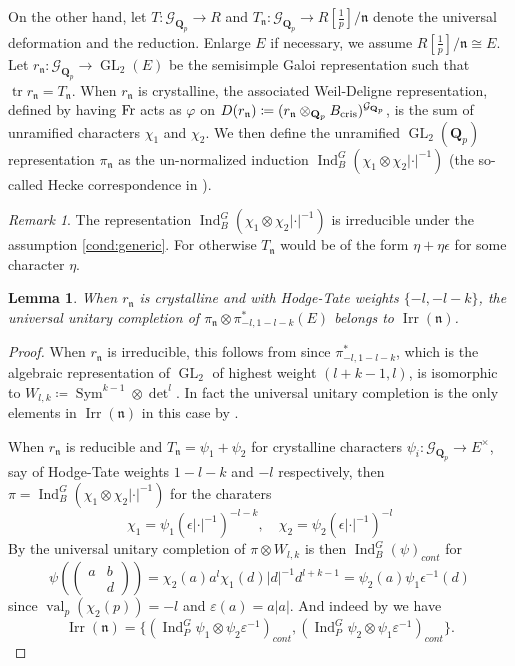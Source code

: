 \documentclass[leqno]{amsart}
\newtheorem{lem}[thm]{Lemma}
\theoremstyle{definition}
\theoremstyle{remark}
\newtheorem{rem}[thm]{Remark}
\newcommand{\Qp}{\mathbf{Q}_p}
\DeclareMathOperator{\Ind}{Ind}
\DeclareMathOperator{\Sym}{Sym}
\DeclareMathOperator{\GL}{GL}
\DeclareMathOperator{\mtr}{tr}
\DeclareMathOperator{\val}{val}
\newcommand{\Fr}{\textnormal{Fr}} %
\newcommand{\cris}{\textnormal{cris}}
\newcommand{\fn}{\mathfrak{n}}
\DeclareMathOperator{\Irr}{Irr}
\newcommand{\Gp}{\mathcal{G}_{\Qp}} %
\begin{document}
On the other hand,
let $T\colon \Gp\to R$ 
and $T_\fn\colon \Gp\to R[\frac{1}{p}]/\fn$ 
denote the universal deformation and 
the reduction.
Enlarge $E$ if necessary,
we assume $R[\frac{1}{p}]/\fn\cong E$.
Let $r_{\fn}\colon \Gp\to \GL_2(E)$
be the semisimple Galoi representation
such that $\mtr r_{\fn}=T_{\fn}$.
When $r_\fn$ is crystalline,
the associated Weil-Deligne representation,
defined by having $\Fr$ acts as $\varphi$
on  $D(r_\fn)\coloneqq (r_\fn\otimes_{\Qp}B_{\cris})^{\Gp}$,
is the sum of 
unramified characters $\chi_1$ and  $\chi_2$.
We then define the unramified
$\GL_2(\Qp)$ representation
$\pi_\fn$
as the un-normalized induction
$\Ind_B^G(\chi_1\otimes\chi_2|\cdot|^{-1})$
(the so-called Hecke correspondence in \cite{pan}).

\begin{rem}
	The representation 
	$\Ind_B^G(\chi_1\otimes\chi_2|\cdot|^{-1})$
	is irreducible under the assumption \eqref{cond:generic}.
	For otherwise
	$T_\fn$ would be of the form
	$\eta+\eta\epsilon$ for some character  $\eta$.
\end{rem}

\begin{lem}\label{lem:uni_completion}
	When $r_\fn$ is crystalline 
	and with 
	Hodge-Tate weights $\{-l,-l-k\}$,
	the universal unitary completion of 
	$\pi_\fn\otimes \pi_{-l,1-l-k}^*(E)$ belongs to 
	$\Irr(\fn)$.
\end{lem}
\begin{proof}
	When  $r_\fn$ is irreducible,
	this follows from \cite[Thm. 1.3]{CDP}
	since 
	$\pi_{-l,1-l-k}^*$,
	which is the algebraic representation of $\GL_2$
	of highest weight  $(l+k-1,l)$,
	is isomorphic to 
	$W_{l,k}\coloneqq \Sym^{k-1}\otimes\det^l$.
	In fact the universal unitary completion
	is the only elements in $\Irr(\fn)$
	in this case by \cite[Cor 8.14]{pask}.
	
	When  $r_\fn$ is reducible
	and $T_\fn=\psi_1+\psi_2$
	for crystalline characters
	$\psi_i\colon \Gp\to E^\times$,
	say of Hodge-Tate weights
	$1-l-k$ and  $-l$ respectively,
	then $\pi=\Ind_B^G(\chi_1\otimes\chi_2|\cdot|^{-1})$
	for the charaters
	\[
	\chi_1=\psi_1(\epsilon|\cdot|^{-1})^{-l-k},\quad
	\chi_2=\psi_2(\epsilon|\cdot|^{-1})^{-l}	
	\]
	By \cite[Thm 12.3]{pask} the universal unitary completion
	of $\pi\otimes W_{l,k}$
	is then $\Ind_B^G(\psi)_{cont}$ for
	\[
		\psi( (\begin{smallmatrix}
			a&b\\&d
		\end{smallmatrix}))
		=\chi_2(a)a^l\chi_1(d)|d|^{-1}d^{l+k-1}
		=\psi_2(a)\psi_1\epsilon^{-1}(d)
	\]
	since $\val_p(\chi_2(p))=-l$ and $\varepsilon(a)=a|a|$.
	And indeed by \cite[Cor 8.15]{pask} we have
	\[
	\Irr(\fn)=\{(\Ind_P^G\psi_1\otimes\psi_2\varepsilon^{-1})_{cont},
	(\Ind_P^G\psi_2\otimes\psi_1\varepsilon^{-1})_{cont}\}.
	\]
\end{proof}
\end{document}
